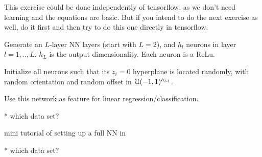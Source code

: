 This exercise could be done independently of tensorflow, as we don't
need learning and the equations are basic. But if you intend to do the
next exercise as well, do it first and then try to do this one
directly in tensorflow.

Generate an $L$-layer NN layers (start with $L=2$), and $h_l$ neurons in layer $l=1,..,L$. $h_L$ is the output dimensionality. Each neuron is a ReLu.

Initialize all neurons such that its $z_i=0$ hyperplane is located randomly, with random orientation and random offset in ${\cal U}(-1,1)^{h_{l{{\hspace*{-.0pt}\text{\rm -}\hspace*{-.5pt}}1}}}$.

Use this network as feature for linear regression/classification.

* which data set?



mini tutorial of setting up a full NN in 

* which data set?


\exerfoot
